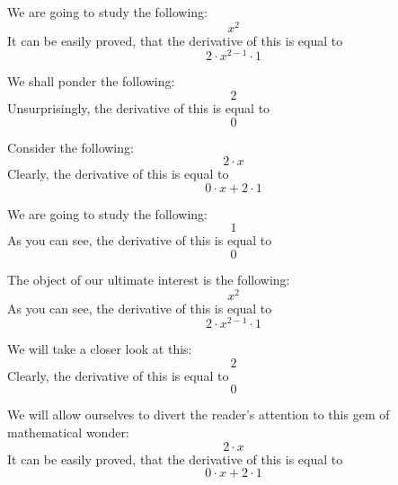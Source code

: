 \documentclass{article}
\begin{document}
We are going to study the following:
\begin{equation}
x ^{2 } 
\end{equation}
It can be easily proved, that the derivative of this is equal to
\begin{equation}
2 \cdot x ^{2 - 1 } \cdot 1 
\end{equation}

We shall ponder the following:
\begin{equation}
2 
\end{equation}
Unsurprisingly, the derivative of this is equal to
\begin{equation}
0 
\end{equation}

Consider the following:
\begin{equation}
2 \cdot x 
\end{equation}
Clearly, the derivative of this is equal to
\begin{equation}
0 \cdot x + 2 \cdot 1 
\end{equation}

We are going to study the following:
\begin{equation}
1 
\end{equation}
As you can see, the derivative of this is equal to
\begin{equation}
0 
\end{equation}

The object of our ultimate interest is the following:
\begin{equation}
x ^{2 } 
\end{equation}
As you can see, the derivative of this is equal to
\begin{equation}
2 \cdot x ^{2 - 1 } \cdot 1 
\end{equation}

We will take a closer look at this:
\begin{equation}
2 
\end{equation}
Clearly, the derivative of this is equal to
\begin{equation}
0 
\end{equation}

We will allow ourselves to divert the reader's attention to this gem of mathematical wonder:
\begin{equation}
2 \cdot x 
\end{equation}
It can be easily proved, that the derivative of this is equal to
\begin{equation}
0 \cdot x + 2 \cdot 1 
\end{equation}
\end{document}
